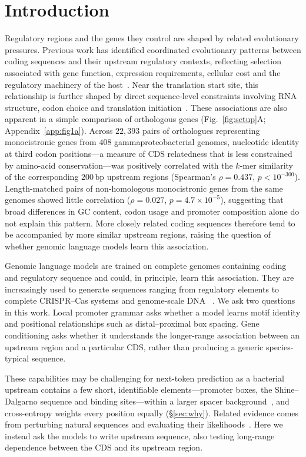 \documentclass{article}
\begin{document}
\section{Introduction}
\label{sec:intro}
Regulatory regions and the genes they control are shaped by related evolutionary
pressures. Previous work has identified coordinated evolutionary patterns between
coding sequences and their upstream regulatory contexts, reflecting selection
associated with gene function, expression requirements, cellular cost and the
regulatory machinery of the
host~\citep{zrimec2020coevolution,zrimec2021regulatorycode}. Near the translation start site, this relationship is further
shaped by direct sequence-level constraints involving RNA structure, codon choice
and translation initiation~\citep{salis2009rbs,kudla2009coding,
cambray2018translation}. These associations are also apparent in a simple
comparison of orthologous genes (Fig.~\ref{fig:setup}A;
Appendix~\ref{app:fig1a}). Across $22{,}393$ pairs of
orthologues representing monocistronic genes from $408$ gammaproteobacterial
genomes, nucleotide identity at third codon positions---a measure of CDS
relatedness that is less constrained by amino-acid conservation---was positively
correlated with the $k$-mer similarity of the corresponding $200$\,bp upstream
regions (Spearman's $\rho=0.437$, $p<10^{-300}$). Length-matched pairs of
non-homologous monocistronic genes from the same genomes showed little correlation
($\rho=0.027$, $p=4.7\times10^{-5}$), suggesting that broad differences in GC
content, codon usage and promoter composition alone do not explain this pattern.
More closely related coding sequences therefore tend to be accompanied by more
similar upstream regions, raising the question of whether genomic language models
learn this association.

Genomic language models are trained on complete genomes containing coding and
regulatory sequence and could, in principle, learn this association. They are
increasingly used to generate sequences ranging from regulatory elements to
complete CRISPR--Cas systems and genome-scale DNA
~\citep{nguyen2024evo,brixi2025evo2,promogen2}. We ask two questions
in this work.  Local promoter grammar asks
whether a model learns motif identity and positional relationships such as
distal--proximal box spacing. Gene conditioning asks whether it understands the
longer-range association between an upstream region and a particular CDS, rather
than producing a generic species-typical sequence.

These capabilities may be challenging for next-token prediction as a
bacterial upstream contains a few short, identifiable elements---promoter boxes, the
Shine--Dalgarno sequence and binding sites---within a larger spacer
background~\citep{ross1993up,spacer2021,salis2009rbs,regulondb2024}, and cross-entropy
weights every position equally (\S\ref{sec:why}). Related evidence comes from
perturbing natural sequences and evaluating their
likelihoods~\citep{invariance2026}. Here we instead ask the models to write
upstream sequence, also testing long-range dependence between the CDS and its
upstream region.
\end{document}
